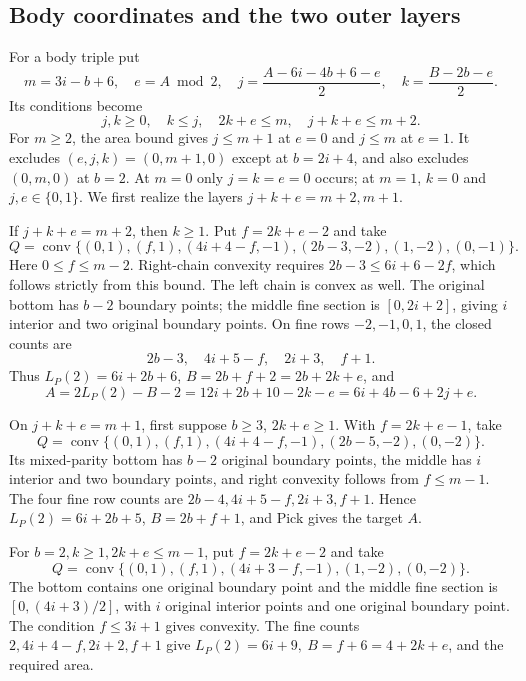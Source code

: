 \documentclass[11pt]{article}
\newcommand{\conv}{\operatorname{conv}}
\begin{document}
\subsection{Body coordinates and the two outer layers}
For a body triple put
\[
 m=3i-b+6,\quad e=A\bmod2,\quad
 j=\frac{A-6i-4b+6-e}{2},\quad k=\frac{B-2b-e}{2}.
\]
Its conditions become
\begin{equation}\label{eq:bodycoords}
 j,k\ge0,\quad k\le j,\quad 2k+e\le m,\quad j+k+e\le m+2.
\end{equation}
For \(m\ge2\), the area bound gives \(j\le m+1\) at \(e=0\) and
\(j\le m\) at \(e=1\). It excludes
\((e,j,k)=(0,m+1,0)\) except at \(b=2i+4\), and also excludes
\((0,m,0)\) at \(b=2\). At \(m=0\) only \(j=k=e=0\) occurs;
at \(m=1\), \(k=0\) and \(j,e\in\{0,1\}\).
We first realize the layers \(j+k+e=m+2,m+1\).

If \(j+k+e=m+2\), then \(k\ge1\). Put \(f=2k+e-2\) and take
\begin{equation}\label{eq:outer2}
 Q=\conv\{(0,1),(f,1),(4i+4-f,-1),(2b-3,-2),(1,-2),(0,-1)\}.
\end{equation}
Here \(0\le f\le m-2\).
Right-chain convexity requires \(2b-3\le6i+6-2f\), which follows
strictly from this bound. The left chain is convex as well.
The original bottom has \(b-2\) boundary points; the middle fine
section is \([0,2i+2]\), giving \(i\) interior and two original boundary
points. On fine rows \(-2,-1,0,1\), the closed counts are
\[
 2b-3,\quad4i+5-f,\quad2i+3,\quad f+1.
\]
Thus \(L_P(2)=6i+2b+6\), \(B=2b+f+2=2b+2k+e\), and
\[
 A=2L_P(2)-B-2=12i+2b+10-2k-e
   =6i+4b-6+2j+e.
\]

On \(j+k+e=m+1\), first suppose \(b\ge3\), \(2k+e\ge1\).
With \(f=2k+e-1\), take
\begin{equation}\label{eq:outer1}
 Q=\conv\{(0,1),(f,1),(4i+4-f,-1),(2b-5,-2),(0,-2)\}.
\end{equation}
Its mixed-parity bottom has \(b-2\) original boundary points, the middle
has \(i\) interior and two boundary points, and right convexity follows
from \(f\le m-1\). The four fine row counts are
\(2b-4,4i+5-f,2i+3,f+1\). Hence \(L_P(2)=6i+2b+5\),
\(B=2b+f+1\), and Pick gives the target \(A\).

For \(b=2,k\ge1,2k+e\le m-1\), put \(f=2k+e-2\) and take
\[
 Q=\conv\{(0,1),(f,1),(4i+3-f,-1),(1,-2),(0,-2)\}.
\]
The bottom contains one original boundary point and the middle fine
section is \([0,(4i+3)/2]\), with \(i\) original interior points and
one original boundary point. The condition \(f\le3i+1\) gives convexity.
The fine counts \(2,4i+4-f,2i+2,f+1\) give
\(L_P(2)=6i+9,\ B=f+6=4+2k+e\), and the required area.
\end{document}
